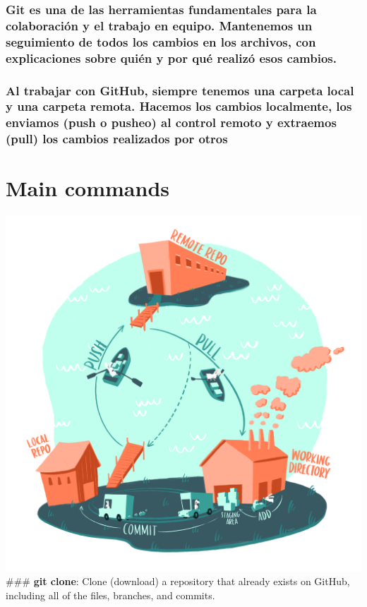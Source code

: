 \documentclass[
]{article}
\begin{document}
\subsubsection{Git es una de las herramientas fundamentales para la
colaboración y el trabajo en equipo. Mantenemos un seguimiento de todos
los cambios en los archivos, con explicaciones sobre quién y por qué
realizó esos
cambios.}\label{git-es-una-de-las-herramientas-fundamentales-para-la-colaboraciuxf3n-y-el-trabajo-en-equipo.-mantenemos-un-seguimiento-de-todos-los-cambios-en-los-archivos-con-explicaciones-sobre-quiuxe9n-y-por-quuxe9-realizuxf3-esos-cambios.}

\subsubsection{Al trabajar con GitHub, siempre tenemos una carpeta local
y una carpeta remota. Hacemos los cambios localmente, los enviamos (push
o pusheo) al control remoto y extraemos (pull) los cambios realizados
por
otros}\label{al-trabajar-con-github-siempre-tenemos-una-carpeta-local-y-una-carpeta-remota.-hacemos-los-cambios-localmente-los-enviamos-push-o-pusheo-al-control-remoto-y-extraemos-pull-los-cambios-realizados-por-otros}

\newpage

\section{Main commands}\label{main-commands}

\includegraphics{git_workflow.png} \#\#\# \textbf{git clone}: Clone
(download) a repository that already exists on GitHub, including all of
the files, branches, and commits.
\end{document}
